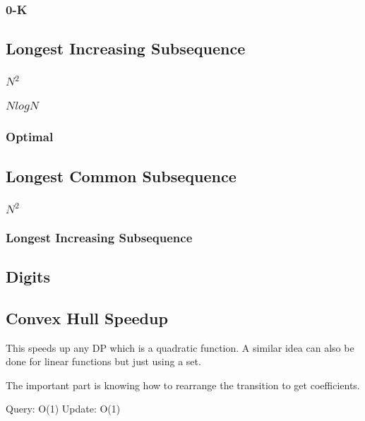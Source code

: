 \documentclass{article}
\begin{document}
\subsubsection{0-K}


\subsection{Longest Increasing Subsequence}
\subsubsection{$N^{2}$}

\subsubsection{$N log N$}

\subsubsection{Optimal}


\subsection{Longest Common Subsequence}
\subsubsection{$N^{2}$}

\subsubsection{Longest Increasing Subsequence}


\subsection{Digits}


\subsection{Convex Hull Speedup}

\begin{flushleft}
This speeds up any DP which is a quadratic function.
A similar idea can also be done for linear functions but just using a set.

The important part is knowing how to rearrange the transition to get coefficients.

Query: O(1)
Update: O(1)
\end{flushleft}
\end{document}
